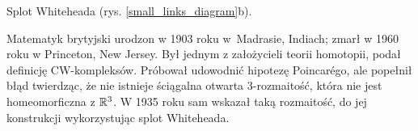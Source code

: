 \begin{example}
%
%
    Splot Whiteheada (rys. \ref{small_links_diagram}b).
\end{example}

\begin{remark}
    Matematyk brytyjski urodzon w 1903 roku w~Madrasie, Indiach; zmarł w 1960 roku w Princeton, New Jersey.
    Był jednym z założycieli teorii homotopii, podał definicję CW-kompleksów.
    Próbował udowodnić hipotezę Poincarégo, ale popełnił błąd twierdząc, że nie istnieje ściągalna otwarta 3-rozmaitość, która nie jest homeomorficzna z $\mathbb R^3$.
    W 1935 roku sam wskazał taką rozmaitość, do jej konstrukcji wykorzystując splot Whiteheada.
\end{remark}

